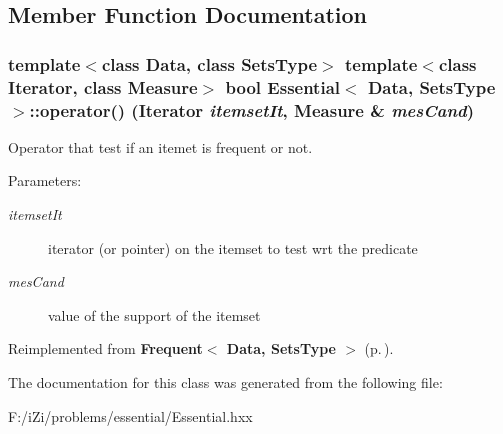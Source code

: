 \subsection{Member Function Documentation}
\subsubsection{\setlength{\rightskip}{0pt plus 5cm}template$<$class Data, class Sets\-Type$>$ template$<$class Iterator, class Measure$>$ bool {\bf Essential}$<$ Data, Sets\-Type $>$::operator() (Iterator {\em itemset\-It}, Measure \& {\em mes\-Cand})\hspace{0.3cm}{\tt  [inline]}}\label{class_essential_e6a89fa2543fe441619066b0f4f6323b}


Operator that test if an itemet is frequent or not. 

\begin{Desc}
\item[Parameters:]
\begin{description}
\item[{\em itemset\-It}]iterator (or pointer) on the itemset to test wrt the predicate \item[{\em mes\-Cand}]value of the support of the itemset \end{description}
\end{Desc}


Reimplemented from {\bf Frequent$<$ Data, Sets\-Type $>$} {\rm (p.\,\pageref{class_frequent_82e02ab1cf1749ea52e9603dc06a5d15})}.

The documentation for this class was generated from the following file:\begin{CompactItemize}
\item 
F:/i\-Zi/problems/essential/Essential.hxx\end{CompactItemize}
